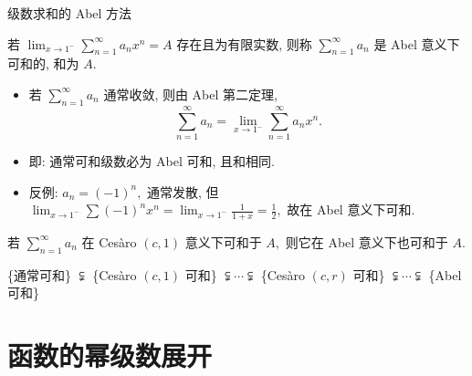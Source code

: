 \graymode
\begin{frame}{级数求和的 Abel 方法}

\begin{Def}
若 $\lim_{x \to 1^-} \sum_{n=1}^\infty a_n x^n = A$ 存在且为有限实数, 则称 $\sum_{n=1}^\infty a_n$ 是 Abel 意义下可和的, 和为 $A.$
\end{Def}

\pause

\begin{itemize}
\item 若 $\sum_{n=1}^\infty a_n$ 通常收敛, 则由 Abel 第二定理,
\[\sum_{n=1}^\infty a_n = \lim_{x \to 1^-} \sum_{n=1}^\infty a_n x^n.\]
\pause
\item 即: 通常可和级数必为 Abel 可和, 且和相同.
\pause
\item 反例: $a_n = (-1)^n,$ 通常发散, 但 $\lim_{x \to 1^-} \sum (-1)^n x^n = \lim_{x \to 1^-} \frac{1}{1+x} = \frac{1}{2},$ 故在 Abel 意义下可和.
\end{itemize}

\pause

\begin{thm}
若 $\sum_{n=1}^\infty a_n$ 在 Cesàro $(c, 1)$ 意义下可和于 $A,$ 则它在 Abel 意义下也可和于 $A.$
\end{thm}

\pause

\begin{center}
\{通常可和\} $\subsetneqq$ \{Cesàro $(c,1)$ 可和\} $\subsetneqq \cdots \subsetneqq$ \{Cesàro $(c,r)$ 可和\} $\subsetneqq \cdots \subsetneqq$ \{Abel 可和\}
\end{center}

\end{frame}
\normalmode


\section{函数的幂级数展开}


